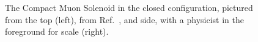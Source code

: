 \begin{figure}[htb]
    \centering
    \quad
    \caption[The Compact Muon Solenoid in the closed configuration, pictured from the top and side, with a physicist in the foreground for scale]{
        The Compact Muon Solenoid in the closed configuration, pictured from the top (left), from Ref.~\cite{CMS:2009kms}, and side, with a physicist in the foreground for scale (right). 
    }
    \label{fig:cms_jguiang}
\end{figure}

